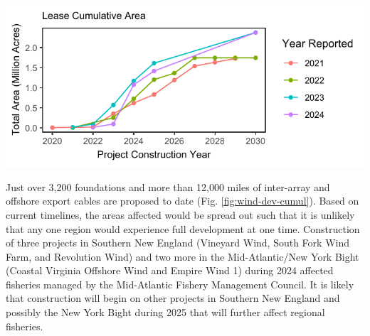 \documentclass[
  10pt,
]{article}
\begin{document}
\begin{center}\includegraphics{midatlantic_files/figure-latex/wind-proposed-dev-1} \end{center}

Just over 3,200 foundations and more than 12,000 miles of inter-array and offshore export cables are proposed to date (Fig. \ref{fig:wind-dev-cumul}). Based on current timelines, the areas affected would be spread out such that it is unlikely that any one region would experience full development at one time. Construction of three projects in Southern New England (Vineyard Wind, South Fork Wind Farm, and Revolution Wind) and two more in the Mid-Atlantic/New York Bight (Coastal Virginia Offshore Wind and Empire Wind 1) during 2024 affected fisheries managed by the Mid-Atlantic Fishery Management Council. It is likely that construction will begin on other projects in Southern New England and possibly the New York Bight during 2025 that will further affect regional fisheries.
\end{document}
